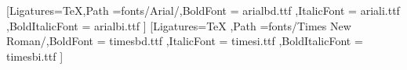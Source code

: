 \usepackage{ifthen}

\usepackage{geometry}\geometry{
    a4paper, %
    left=40mm,
    right=20mm,
    top=25mm,
    bottom=25mm,
    footskip=10mm,
    headheight=20mm %
}

\renewcommand*{\chapterheadstartvskip}{\vspace*{0mm}}

\usepackage{verbatim}

\usepackage{fontspec}

    {
        \setmainfont{arial.ttf}[Ligatures=TeX,Path =fonts/Arial/,BoldFont = arialbd.ttf ,ItalicFont = ariali.ttf ,BoldItalicFont = arialbi.ttf ]
    }
    {
        \setmainfont{times.ttf}[Ligatures=TeX ,Path =fonts/Times New Roman/,BoldFont = timesbd.ttf ,ItalicFont = timesi.ttf ,BoldItalicFont = timesbi.ttf ]
    }

\renewcommand{\baselinestretch}{1.5}

\usepackage[ngerman]{babel}
\usepackage{csquotes}

\parindent0pt



\usepackage{pdflscape}



\usepackage[table]{xcolor}


\usepackage{graphicx}


